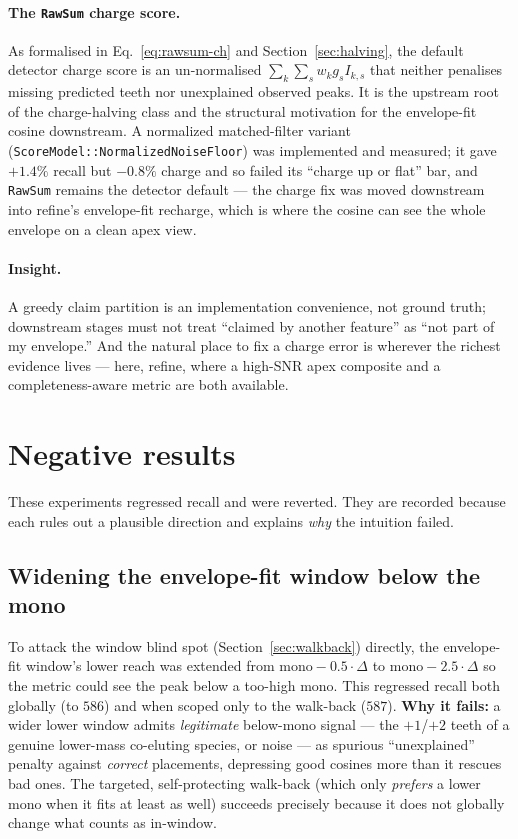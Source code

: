 \documentclass[11pt]{article}
\begin{document}
\paragraph{The \texttt{RawSum} charge score.} As formalised in Eq.~\ref{eq:rawsum-ch} and
Section~\ref{sec:halving}, the default detector charge score is an un-normalised
$\sum_k\sum_s w_k g_s I_{k,s}$ that neither penalises missing predicted teeth nor unexplained
observed peaks. It is the upstream root of the charge-halving class and the structural motivation
for the envelope-fit cosine downstream. A normalized matched-filter variant
(\texttt{ScoreModel::NormalizedNoiseFloor}) was implemented and measured; it gave $+1.4\%$ recall
but $-0.8\%$ charge and so failed its ``charge up or flat'' bar, and \texttt{RawSum} remains the
detector default --- the charge fix was moved downstream into refine's envelope-fit recharge, which
is where the cosine can see the whole envelope on a clean apex view.

\paragraph{Insight.} A greedy claim partition is an implementation convenience, not ground truth;
downstream stages must not treat ``claimed by another feature'' as ``not part of my envelope.''
And the natural place to fix a charge error is wherever the richest evidence lives --- here,
refine, where a high-SNR apex composite and a completeness-aware metric are both available.

\section{Negative results}
\label{sec:negative}

These experiments regressed recall and were reverted. They are recorded because each rules out a
plausible direction and explains \emph{why} the intuition failed.

\subsection{Widening the envelope-fit window below the mono}
\label{sec:neg-window}
To attack the window blind spot (Section~\ref{sec:walkback}) directly, the envelope-fit window's
lower reach was extended from $\text{mono}-0.5\cdot\Delta$ to $\text{mono}-2.5\cdot\Delta$ so the
metric could see the peak below a too-high mono. This regressed recall both globally (to $586$) and
when scoped only to the walk-back ($587$). \textbf{Why it fails:} a wider lower window admits
\emph{legitimate} below-mono signal --- the $+1$/$+2$ teeth of a genuine lower-mass co-eluting
species, or noise --- as spurious ``unexplained'' penalty against \emph{correct} placements,
depressing good cosines more than it rescues bad ones. The targeted, self-protecting walk-back (which
only \emph{prefers} a lower mono when it fits at least as well) succeeds precisely because it does
not globally change what counts as in-window.
\end{document}
